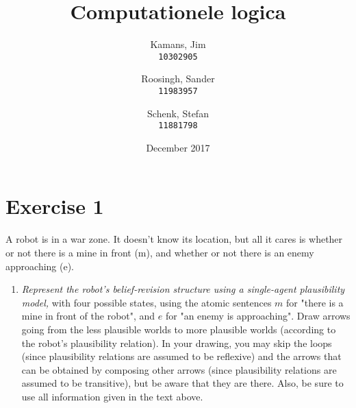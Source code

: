 \documentclass[leqno]{article}
\title{Computationele logica}
\author{
    Kamans, Jim\\
    \texttt{10302905}
    \and
    Roosingh, Sander\\
    \texttt{11983957}
    \and
    Schenk, Stefan\\
    \texttt{11881798}
}
\date{December 2017}
\begin{document}
\maketitle

\section*{Exercise 1}
A robot is in a war zone. It doesn’t know its location, but all it cares is
whether or not there is a mine in front (m), and whether or not there is an
enemy approaching (e).

\begin{enumerate}
  \item \textit{Represent the robot's belief-revision structure using a single-agent plausibility model,} with four possible states, using the atomic sentences $m$ for "there is a mine in front of the robot", and $e$ for "an enemy is approaching". Draw arrows going from the less plausible worlds to more plausible worlds (according to the robot's plausibility relation). In your drawing, you may skip the loops (since plausibility relations are assumed to be reflexive) and the arrows that can be obtained by composing other arrows (since plausibility relations are assumed to be transitive), but be aware that they are there. Also, be sure to use all information given in the text above.\\

  \begin{center}
  \end{center}


\end{enumerate}
\end{document}
